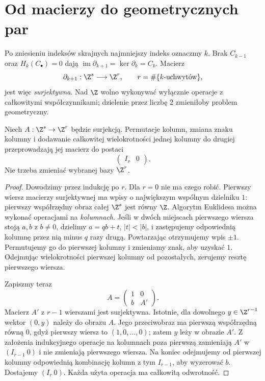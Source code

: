 \section{Od macierzy do geometrycznych par}
\label{sec:macierze-hc-19}

Po zniesieniu indeksów skrajnych
najmniejszy indeks oznaczmy $k$.
Brak $C_{k-1}$ oraz
$H_k(C_\bullet)=0$ dają
$\operatorname{im}\partial_{k+1}
=\ker\partial_k=C_k$.
Macierz
\[
 \partial_{k+1}:\Z^s\longrightarrow\Z^r,
 \qquad r=\#\{k\text{-uchwytów}\},
\]
jest więc \emph{surjektywna}.
Nad $\Z$ wolno wykonywać
wyłącznie operacje z
całkowitymi współczynnikami;
dzielenie przez liczbę $2$
zmieniłoby problem geometryczny.

\begin{lemat}
\label{lem:macierz-surj-hc-19}
Niech $A:\Z^s\to\Z^r$
będzie surjekcją.
Permutacje kolumn, zmiana
znaku kolumny i dodawanie
całkowitej wielokrotności
jednej kolumny do drugiej
przeprowadzają jej macierz
do postaci
\[
       \begin{pmatrix}I_r&0\end{pmatrix}.
\]
Nie trzeba zmieniać
wybranej bazy $\Z^r$.
\end{lemat}
\begin{proof}
Dowodzimy przez indukcję po $r$.
Dla $r=0$ nie ma czego robić.
Pierwszy wiersz macierzy
surjektywnej ma wpisy
o największym wspólnym
dzielniku $1$: pierwszy
współrzędny obraz całej
$\Z^s$ jest równy $\Z$.
Algorytm Euklidesa można
wykonać operacjami na
\emph{kolumnach}.
Jeśli w dwóch miejscach
pierwszego wiersza stoją
$a,b$ z $b\ne0$, dzielimy
$a=qb+t$, $|t|<|b|$,
i zastępujemy odpowiednią
kolumnę przez nią minus
$q$ razy drugą. Powtarzając
otrzymujemy wpis $\pm1$.
Permutujemy go do pierwszej
kolumny i zmieniamy znak,
aby uzyskać $1$.
Odejmując wielokrotności
pierwszej kolumny od
pozostałych, zerujemy
resztę pierwszego wiersza.

Zapiszmy teraz
\[
 A=\begin{pmatrix}
       1&0\\
       b&A'
    \end{pmatrix}.
\]
Macierz $A'$ z $r-1$
wierszami jest surjektywna.
Istotnie, dla dowolnego
$y\in\Z^{r-1}$ wektor
$(0,y)$ należy do obrazu $A$.
Jego przeciwobraz ma
pierwszą współrzędną
równą $0$, gdyż pierwszy
wiersz to $(1,0,\ldots,0)$;
zatem $y$ leży w obrazie
$A'$. Z założenia
indukcyjnego operacje
na kolumnach poza pierwszą
zamieniają $A'$ w
$(I_{r-1}\ 0)$ i nie
zmieniają pierwszego wiersza.
Na koniec odejmujemy
od pierwszej kolumny
odpowiednią kombinację
kolumn z tym $I_{r-1}$,
aby wyzerować $b$.
Dostajemy $(I_r\ 0)$.
Każda użyta operacja
ma całkowitą odwrotność.
\end{proof}

